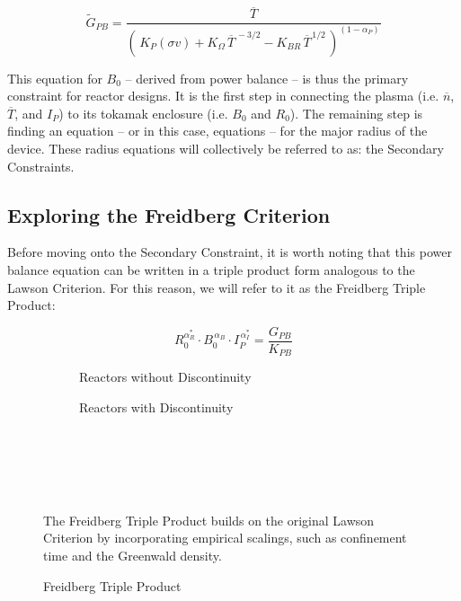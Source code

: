 \begin{equation}
	\tilde G_{PB} = \frac{ \overline{T} }{ \left( \, K_P (\sigma v) + K_\Omega  \, \overline{T}^{  \,-3/2 } - K_{BR} \, \overline{T}^{  \,1/2 } \, \right) ^ { ( 1 - \alpha_P ) } }
\end{equation}

This equation for $B_0$ -- derived from power balance -- is thus the primary constraint for reactor designs. It is the first step in connecting the plasma (i.e. $\overline n$, $\overline T$, and $I_P$) to its tokamak enclosure (i.e. $B_0$ and $R_0$). The remaining step is finding an equation -- or in this case, equations -- for the major radius of the device. These radius equations will collectively be referred to as: the Secondary Constraints. 

\subsection{Exploring the Freidberg Criterion}

Before moving onto the Secondary Constraint, it is worth noting that this power balance equation can be written in a triple product form analogous to the Lawson Criterion. For this reason, we will refer to it as the Freidberg Triple Product:

\begin{equation}
	\label{eq:freidberg}
	R_0^{ \alpha_R^* } \cdot B_0^{\,\alpha_B} \cdot I_P^{\,\alpha_I^*} = \frac{ G_{PB} }{ K_{PB} }
\end{equation}

\begin{figure*}[h]
    \centering
    \hfill 
    \begin{subfigure}[t]{0.45\textwidth}
        \centering
		\begin{adjustbox}{width=\textwidth}
			\Large
			
		\end{adjustbox}
        \caption{Reactors without Discontinuity}
    \end{subfigure}
    \hfill
    \begin{subfigure}[t]{0.45\textwidth}
        \centering
		\begin{adjustbox}{width=\textwidth}
			\Large
			
		\end{adjustbox}
        \caption{Reactors with Discontinuity}
    \end{subfigure}
    \hfill \hfill ~\\ ~\\ ~\\
    \caption{Freidberg Triple Product} ~\\
    \small The Freidberg Triple Product builds on the original Lawson Criterion by incorporating empirical scalings, such as confinement time and the Greenwald density.
\end{figure*}

